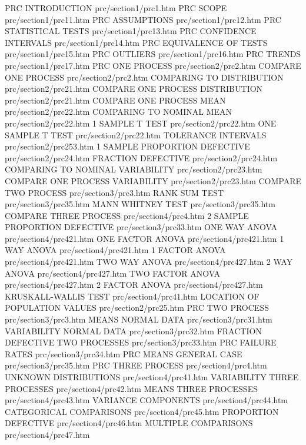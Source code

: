 PRC INTRODUCTION                        prc/section1/prc1.htm
PRC SCOPE                               prc/section1/prc11.htm
PRC ASSUMPTIONS                         prc/section1/prc12.htm
PRC STATISTICAL TESTS                   prc/section1/prc13.htm
PRC CONFIDENCE INTERVALS                prc/section1/prc14.htm
PRC EQUIVALENCE OF TESTS                prc/section1/prc15.htm
PRC OUTLIERS                            prc/section1/prc16.htm
PRC TRENDS                              prc/section1/prc17.htm
PRC ONE PROCESS                         prc/section2/prc2.htm
COMPARE ONE PROCESS                     prc/section2/prc2.htm
COMPARING TO DISTRIBUTION               prc/section2/prc21.htm
COMPARE ONE PROCESS DISTRIBUTION        prc/section2/prc21.htm
COMPARE ONE PROCESS MEAN                prc/section2/prc22.htm
COMPARING TO NOMINAL MEAN               prc/section2/prc22.htm
1 SAMPLE T TEST                         prc/section2/prc22.htm
ONE SAMPLE T TEST                       prc/section2/prc22.htm
TOLERANCE INTERVALS                     prc/section2/prc253.htm
1 SAMPLE PROPORTION DEFECTIVE           prc/section2/prc24.htm
FRACTION DEFECTIVE                      prc/section2/prc24.htm
COMPARING TO NOMINAL VARIABILITY        prc/section2/prc23.htm
COMPARE ONE PROCESS VARIABILITY         prc/section2/prc23.htm
COMPARE TWO PROCESS                     prc/section3/prc3.htm
RANK SUM TEST                           prc/section3/prc35.htm
MANN WHITNEY TEST                       prc/section3/prc35.htm
COMPARE THREE PROCESS                   prc/section4/prc4.htm
2 SAMPLE PROPORTION DEFECTIVE           prc/section3/prc33.htm
ONE WAY ANOVA                           prc/section4/prc421.htm
ONE FACTOR ANOVA                        prc/section4/prc421.htm
1 WAY ANOVA                             prc/section4/prc421.htm
1 FACTOR ANOVA                          prc/section4/prc421.htm
TWO WAY ANOVA                           prc/section4/prc427.htm
2 WAY ANOVA                             prc/section4/prc427.htm
TWO FACTOR ANOVA                        prc/section4/prc427.htm
2 FACTOR ANOVA                          prc/section4/prc427.htm
KRUSKALL-WALLIS TEST                    prc/section4/prc41.htm
LOCATION OF POPULATION VALUES           prc/section2/prc25.htm
PRC TWO PROCESS                         prc/section3/prc3.htm
MEANS NORMAL DATA                       prc/section3/prc31.htm
VARIABILITY NORMAL DATA                 prc/section3/prc32.htm
FRACTION DEFECTIVE TWO PROCESSES        prc/section3/prc33.htm
PRC FAILURE RATES                       prc/section3/prc34.htm
PRC MEANS GENERAL CASE                  prc/section3/prc35.htm
PRC THREE PROCESS                       prc/section4/prc4.htm
UNKNOWN DISTRIBUTIONS                   prc/section4/prc41.htm
VARIABILITY THREE PROCESSES             prc/section4/prc42.htm
MEANS THREE PROCESSES                   prc/section4/prc43.htm
VARIANCE COMPONENTS                     prc/section4/prc44.htm
CATEGORICAL COMPARISONS                 prc/section4/prc45.htm
PROPORTION DEFECTIVE                    prc/section4/prc46.htm
MULTIPLE COMPARISONS                    prc/section4/prc47.htm

